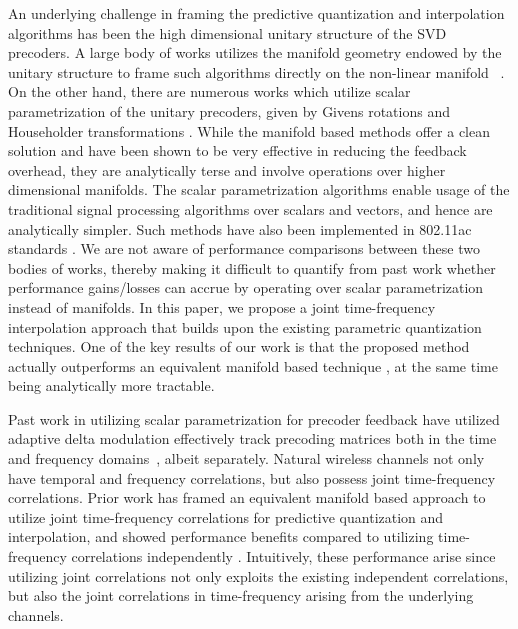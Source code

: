 \documentclass[journal,10pt,twocolumn]{IEEEtran}
\begin{document}
An underlying challenge in framing the predictive quantization and interpolation algorithms has been the high dimensional unitary structure of the SVD precoders. A large body of works utilizes the manifold geometry endowed by the unitary structure to frame such algorithms directly on the non-linear manifold ~\cite{mondal2007quantization,schwarz2013adaptive,5946308,6891198,Gupt1905:Predictive,pitaval2013codebooks}. On the other hand, there are numerous works which utilize scalar parametrization of the unitary precoders, given by Givens rotations and Householder transformations \cite{4114278,4556174,lou2013comparison}. While the manifold based methods offer a clean solution and have been shown to be very effective in reducing the feedback overhead, they are analytically terse and
involve operations over higher dimensional manifolds. The scalar parametrization algorithms enable usage of the traditional signal processing algorithms over scalars and vectors, and hence are analytically simpler.
Such methods have also been implemented in 802.11ac standards
\cite{lou2013comparison}. We are not aware of performance comparisons
between these two bodies of works, thereby making it difficult to
quantify from past work whether performance gains/losses can accrue by operating over scalar parametrization instead of manifolds. In this paper, we propose a joint time-frequency interpolation approach that builds upon the existing parametric quantization techniques. One of the key results of our work is that the proposed method actually outperforms an equivalent manifold based technique \cite{Gupt1905:Predictive}, at the same time being analytically more tractable.

Past work in utilizing scalar
parametrization for precoder feedback have utilized adaptive delta
modulation effectively track precoding matrices both in the
time~\cite{4114278} and frequency domains~\cite{4556174}, albeit
separately. Natural wireless channels not only have temporal and
frequency correlations, but also possess joint time-frequency
correlations. Prior work \cite{Gupt1905:Predictive} has framed an equivalent manifold based approach to utilize joint time-frequency correlations for predictive quantization and interpolation, and showed performance benefits compared to utilizing time-frequency correlations independently \cite{6891198,khaled2005quantized}.
Intuitively, these performance arise since utilizing joint
correlations not only exploits the existing independent correlations,
but also the joint correlations in time-frequency arising from the underlying channels.
\end{document}
